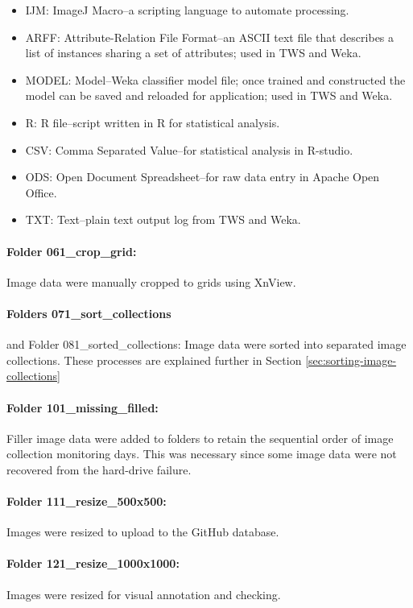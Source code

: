 \begin{itemize}
\item IJM: ImageJ Macro--a scripting language to automate processing.
\item ARFF: Attribute-Relation File Format--an ASCII text file that describes a list of instances sharing a set of attributes; used in \ac{TWS} and \ac{Weka}.
\item MODEL: Model--\ac{Weka} classifier model file; once trained and constructed the model can be saved and reloaded for application; used in \ac{TWS} and \ac{Weka}.
\item R: R file--script written in R for statistical analysis.
\item CSV: Comma Separated Value--for statistical analysis in R-studio.
\item ODS: Open Document Spreadsheet--for raw data entry in Apache Open Office.
\item TXT: Text--plain text output log from \ac{TWS} and \ac{Weka}.
\end{itemize}

\paragraph{Folder 061\_crop\_grid:} Image data were manually cropped to grids using XnView.

\paragraph{Folders 071\_sort\_collections} and Folder 081\_sorted\_collections: Image data were sorted into separated image collections. These processes are explained further in Section \ref{sec:sorting-image-collections} 

\paragraph{Folder 101\_missing\_filled:} Filler image data were added to folders to retain the sequential order of image collection monitoring days. This was necessary since some image data were not recovered from the hard-drive failure.

\paragraph{Folder 111\_resize\_500x500:} Images were resized to upload to the GitHub database.

\paragraph{Folder 121\_resize\_1000x1000:} Images were resized for visual annotation and checking.


